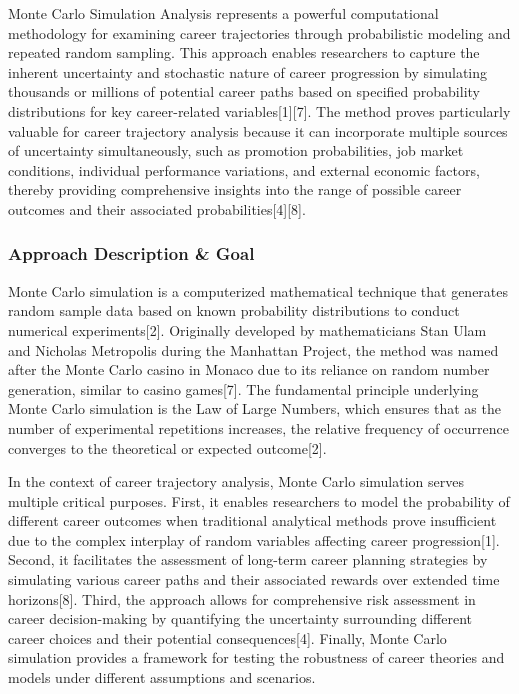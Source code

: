 \documentclass[main.tex]{subfiles}
\begin{document}
Monte Carlo Simulation Analysis represents a powerful computational methodology for examining career trajectories through probabilistic modeling and repeated random sampling. This approach enables researchers to capture the inherent uncertainty and stochastic nature of career progression by simulating thousands or millions of potential career paths based on specified probability distributions for key career-related variables[1][7]. The method proves particularly valuable for career trajectory analysis because it can incorporate multiple sources of uncertainty simultaneously, such as promotion probabilities, job market conditions, individual performance variations, and external economic factors, thereby providing comprehensive insights into the range of possible career outcomes and their associated probabilities[4][8].

\subsubsection{Approach Description \& Goal}

Monte Carlo simulation is a computerized mathematical technique that generates random sample data based on known probability distributions to conduct numerical experiments[2]. Originally developed by mathematicians Stan Ulam and Nicholas Metropolis during the Manhattan Project, the method was named after the Monte Carlo casino in Monaco due to its reliance on random number generation, similar to casino games[7]. The fundamental principle underlying Monte Carlo simulation is the Law of Large Numbers, which ensures that as the number of experimental repetitions increases, the relative frequency of occurrence converges to the theoretical or expected outcome[2].

In the context of career trajectory analysis, Monte Carlo simulation serves multiple critical purposes. First, it enables researchers to model the probability of different career outcomes when traditional analytical methods prove insufficient due to the complex interplay of random variables affecting career progression[1]. Second, it facilitates the assessment of long-term career planning strategies by simulating various career paths and their associated rewards over extended time horizons[8]. Third, the approach allows for comprehensive risk assessment in career decision-making by quantifying the uncertainty surrounding different career choices and their potential consequences[4]. Finally, Monte Carlo simulation provides a framework for testing the robustness of career theories and models under different assumptions and scenarios.
\end{document}
